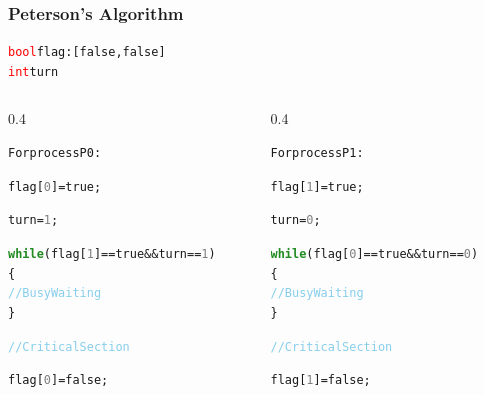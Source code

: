 \documentclass[xcolor=dvipsnames]{beamer}
\begin{document}
\begin{frame}[fragile]
	\frametitle{Peterson's Algorithm}
	\fontsize{8}{7.2}\selectfont
	\begin{alltt}
		\textcolor{red}{bool} flag :[\textcolor{OliveGreen}{false},\textcolor{OliveGreen}{false}]
		\textcolor{red}{int} turn
	\end{alltt} 
\centering
	\begin{columns}
		\begin{column} {0.4\textwidth}
			\begin{alltt}
				For process \textcolor{NavyBlue}{P0}:
				
				flag[\textcolor{Gray}{0}] = \textcolor{OliveGreen}{true};
				
				turn = \textcolor{Gray}{1};
				
				\textcolor{ForestGreen}{\textbf{while}} (flag[\textcolor{Gray}{1}] == \textcolor{OliveGreen}{true} && turn ==\textcolor{Gray}{1})
				\{
				\hspace*{1cm}\textcolor{SkyBlue}{//Busy Waiting}
				\}
				
				\textcolor{SkyBlue}{//Critical Section}
				
				flag[\textcolor{Gray}{0}] = \textcolor{OliveGreen}{false};
			\end{alltt}
		\end{column}
		\begin{column} {0.4\textwidth}
			\begin{alltt}
				For process \textcolor{NavyBlue}{P1}:
				
				flag[\textcolor{Gray}{1}] = \textcolor{OliveGreen}{true};
				
				turn = \textcolor{Gray}{0};
				
				\textcolor{ForestGreen}{\textbf{while}} (flag[\textcolor{Gray}{0}] == \textcolor{OliveGreen}{true} && turn ==\textcolor{Gray}{0})
				\{
				\hspace*{1cm}\textcolor{SkyBlue}{//Busy Waiting}
				\}
				
				\textcolor{SkyBlue}{//Critical Section}
				
				flag[\textcolor{Gray}{1}] = \textcolor{OliveGreen}{false};
			\end{alltt}
		\end{column}
		
	\end{columns}
\end{frame}
\end{document}
